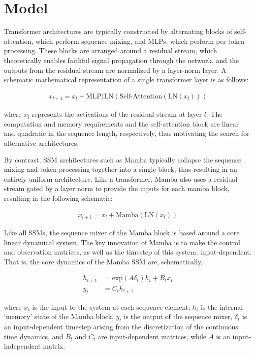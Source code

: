 \section{Model}

Transformer architectures are typically constructed by alternating blocks of self-attention, which perform sequence mixing, and MLPs, which perform per-token processing. These blocks are arranged around a residual stream, which theoretically enables faithful signal propagation through the network, and the outputs from the residual stream are normalized by a layer-norm layer. A schematic mathematical representation of a single transformer layer is as follows:

\begin{align}
    x_{l+1} = x_l +  \text{MLP}(\text{LN}(\text{Self-Attention}(\text{LN}(x_l)))
\end{align}

where $x_l$ represents the activations of the residual stream at layer $l$. The computation and memory requirements and the self-attention block are linear and quadratic in the sequence length, respectively, thus motivating the search for alternative architectures.

By contrast, SSM architectures such as Mamba typically collapse the sequence mixing and token processing together into a single block, thus resulting in an entirely uniform architecture. Like a transformer, Mamba also uses a residual stream gated by a layer norm to provide the inputs for each mamba block, resulting in the following schematic:

\begin{align}
    x_{l+1} = x_l + \text{Mamba}(\text{LN}(x_l))
\end{align}

Like all SSMs, the sequence mixer of the Mamba block is based around a core linear dynamical system. The key innovation of Mamba is to make the control and observation matrices, as well as the timestep of this system, input-dependent. That is, the core dynamics of the Mamba SSM are, schematically,

\begin{align}
    h_{t+1} &= \text{exp}(A\delta_t) h_t  + B_tx_t  \nonumber \\
    y_t &= C_t h_{t+1} \label{mamba_seq_mix_eqn}
\end{align}

where $x_t$ is the input to the system at each sequence element, $h_t$ is the internal `memory' state of the Mamba block, $y_t$ is the output of the sequence mixer, $\delta_t$ is an input-dependent timestep arising from the discretization of the continuous time dynamics, and $B_t$ and $C_t$ are input-dependent matrices, while $A$ is an input-independent matrix.


